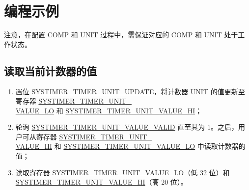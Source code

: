 \documentclass[main\_\_CN.tex]{subfiles}
\begin{document}
\section{编程示例}\label{sec:instructions-of-usage}
注意，在配置 COMP 和 UNIT 过程中，需保证对应的 COMP 和 UNIT 处于工作状态。
\subsection{读取当前计数器的值}\label{sec:to-read-system-timer-value}
\begin{enumerate}
    \item 置位 \hyperref[fielddesc:SYSTIMERTIMERUNIT0UPDATE]{SYSTIMER\_TIMER\_UNIT\_UPDATE}，将计数器 UNIT 的值更新至寄存器 \hyperref[fielddesc:SYSTIMERTIMERUNIT0VALUELO]{SYSTIMER\_TIMER\_UNIT\_\\VALUE\_LO} 和 \hyperref[fielddesc:SYSTIMERTIMERUNIT0VALUEHI]{SYSTIMER\_TIMER\_UNIT\_VALUE\_HI}；
    \item 轮询 \hyperref[fielddesc:SYSTIMERTIMERUNIT0VALUEVALID]{SYSTIMER\_TIMER\_UNIT\_VALUE\_VALID} 直至其为 1。之后，用户可从寄存器 \hyperref[fielddesc:SYSTIMERTIMERUNIT0VALUEHI]{SYSTIMER\_TIMER\_UNIT\_\\VALUE\_HI} 和 \hyperref[fielddesc:SYSTIMERTIMERUNIT0VALUELO]{SYSTIMER\_TIMER\_UNIT\_VALUE\_LO} 中读取计数器的值；
    \item 读取寄存器 \hyperref[fielddesc:SYSTIMERTIMERUNIT0VALUELO]{SYSTIMER\_TIMER\_UNIT\_VALUE\_LO}（低 32 位）和 \hyperref[fielddesc:SYSTIMERTIMERUNIT0VALUEHI]{SYSTIMER\_TIMER\_UNIT\_VALUE\_HI}（高 20 位）。
\end{enumerate}
\end{document}
